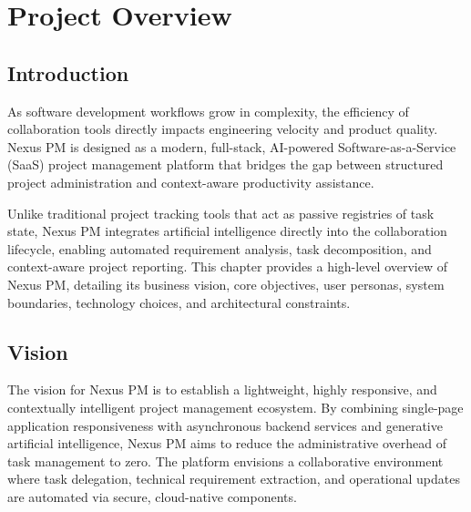 \chapter{Project Overview}
\label{chap:project-overview}

\section{Introduction}
As software development workflows grow in complexity, the efficiency of collaboration tools directly impacts engineering velocity and product quality. Nexus PM is designed as a modern, full-stack, AI-powered Software-as-a-Service (SaaS) project management platform that bridges the gap between structured project administration and context-aware productivity assistance. 

Unlike traditional project tracking tools that act as passive registries of task state, Nexus PM integrates artificial intelligence directly into the collaboration lifecycle, enabling automated requirement analysis, task decomposition, and context-aware project reporting. This chapter provides a high-level overview of Nexus PM, detailing its business vision, core objectives, user personas, system boundaries, technology choices, and architectural constraints.

\section{Vision}
The vision for Nexus PM is to establish a lightweight, highly responsive, and contextually intelligent project management ecosystem. By combining single-page application responsiveness with asynchronous backend services and generative artificial intelligence, Nexus PM aims to reduce the administrative overhead of task management to zero. The platform envisions a collaborative environment where task delegation, technical requirement extraction, and operational updates are automated via secure, cloud-native components.


